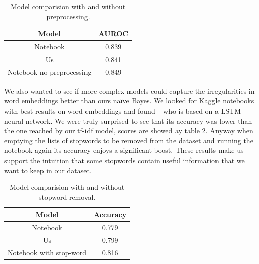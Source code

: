 \documentclass{article}
\begin{document}
    \begin{table}[h!t]
        \centering
        \caption{Model comparision with and without preprocessing.}
        \label{tab:versus_metrics_NB}
        \begin{tabular}{c|c}
            \hline
            Model & AUROC \\
            \hline 
            Notebook & 0.839 \\ 
            Us & 0.841 \\ 
            Notebook no preprocessing & 0.849 \\ 
            \hline
        \end{tabular}
    \end{table}
    
    We also wanted to see if more complex models could capture the irregularities in word embeddings better than ours na\"ive Bayes. 
    We looked for Kaggle notebooks with best results on word embeddings and found ~\cite{startups:notebook2} who is based on a LSTM neural network.
    We were truly surprised to see that its accuracy was lower than the one reached by our tf-idf model, scores are showed ay table \ref{tab:versus_metrics_FT}. 
    Anyway when emptying the lists of stopwords to be removed from the dataset and running the notebook again its accuracy enjoys a significant boost. 
    These results make us support the intuition that some stopwords contain useful information that we want to keep in our dataset. 
    
    \begin{table}[h!t]
        \centering
        \caption{Model comparision with and without stopword removal.}
        \label{tab:versus_metrics_FT}
        \begin{tabular}{c|c}
            \hline
            Model & Accuracy\\
            \hline 
            Notebook & 0.779 \\ 
            Us & 0.799 \\ 
            Notebook with stop-word & 0.816 \\ 
            \hline
        \end{tabular}
    \end{table}
    
\end{document}
